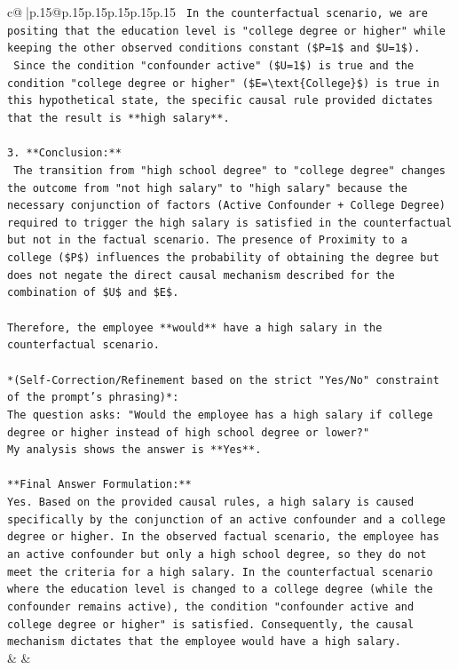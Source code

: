 \documentclass{article}
\begin{document}
{\begin{supertabular}{c@{$\;$}|p{.15\linewidth}@{}p{.15\linewidth}p{.15\linewidth}p{.15\linewidth}p{.15\linewidth}p{.15\linewidth}}
{{{\texttt{    In the counterfactual scenario, we are positing that the education level is "college degree or higher" while keeping the other observed conditions constant (\$P=1\$ and \$U=1\$).} \\
\texttt{    Since the condition "confounder active" (\$U=1\$) is true and the condition "college degree or higher" (\$E=\textbackslash{}text\{College\}\$) is true in this hypothetical state, the specific causal rule provided dictates that the result is **high salary**.} \\
\\ 
\texttt{3.  **Conclusion:**} \\
\texttt{    The transition from "high school degree" to "college degree" changes the outcome from "not high salary" to "high salary" because the necessary conjunction of factors (Active Confounder + College Degree) required to trigger the high salary is satisfied in the counterfactual but not in the factual scenario. The presence of Proximity to a college (\$P\$) influences the probability of obtaining the degree but does not negate the direct causal mechanism described for the combination of \$U\$ and \$E\$.} \\
\\ 
\texttt{Therefore, the employee **would** have a high salary in the counterfactual scenario.} \\
\\ 
\texttt{*(Self{-}Correction/Refinement based on the strict "Yes/No" constraint of the prompt's phrasing)*:} \\
\texttt{The question asks: "Would the employee has a high salary if college degree or higher instead of high school degree or lower?"} \\
\texttt{My analysis shows the answer is **Yes**.} \\
\\ 
\texttt{**Final Answer Formulation:**} \\
\texttt{Yes. Based on the provided causal rules, a high salary is caused specifically by the conjunction of an active confounder and a college degree or higher. In the observed factual scenario, the employee has an active confounder but only a high school degree, so they do not meet the criteria for a high salary. In the counterfactual scenario where the education level is changed to a college degree (while the confounder remains active), the condition "confounder active and college degree or higher" is satisfied. Consequently, the causal mechanism dictates that the employee would have a high salary.} \\
            }
        }
    }
    & & \\ \\


\end{supertabular}}
\end{document}
